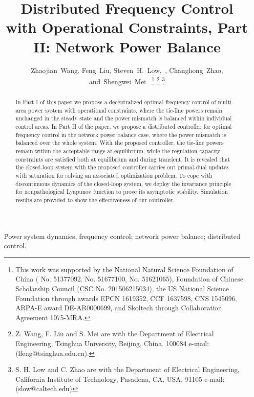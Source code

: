 \documentclass[journal]{IEEEtran}
\title{Distributed Frequency Control with Operational Constraints, Part II: Network Power Balance}
\author{Zhaojian~Wang, Feng~Liu, Steven~H.~Low,~\IEEEmembership{Fellow,~IEEE},
                Changhong~Zhao, and~Shengwei~Mei~\IEEEmembership{Fellow,~IEEE}
                \thanks{This work was supported  by the National Natural Science Foundation
                        of China ( No. 51377092, No. 51677100, No. 51621065), Foundation of Chinese Scholarship Council (CSC No. 201506215034), 
the US National Science Foundation through awards EPCN 1619352, CCF 1637598, 
CNS 1545096, ARPA-E award DE-AR0000699, and Skoltech through Collaboration
                        Agreement 1075-MRA.     }       %
                \thanks{Z. Wang, F. Liu and S. Mei are with the Department
                        of Electrical Engineering, Tsinghua University, Beijing,
                        China, 100084 e-mail: (lfeng@tsinghua.edu.cn).}%
                \thanks{S. H. Low and C. Zhao  are with the Department
                        of Electrical Engineering, California Institute of Technology, Pasadena, CA, USA, 91105 e-mail:(slow@caltech.edu)}
        }
\theoremstyle{definition}
\theoremstyle{definition}
\begin{document}
         \maketitle
        


        
        
\begin{abstract}                                                
    In Part I of this paper we propose a decentralized optimal frequency control of multi-area power system with operational constraints, where the tie-line powers  remain unchanged in the steady state and the power mismatch is balanced within individual control areas. In Part II of the paper, we propose a distributed controller for optimal frequency control in the network power balance case, where the power mismatch is balanced over the whole system. With the proposed controller,
	the tie-line powers remain within the acceptable range at equilibrium, while the regulation capacity constraints are satisfied both at equilibrium and during transient. It is revealed that the closed-loop system with the proposed controller carries out primal-dual updates with saturation for solving an associated optimization problem. To cope with discontinuous dynamics of the closed-loop system, we deploy the invariance principle for nonpathological Lyapunov function to prove its asymptotic stability. Simulation results are provided to show the effectiveness of our controller.
\end{abstract}
                
\begin{IEEEkeywords}
    Power system dynamics, frequency control; network power balance; distributed control.
\end{IEEEkeywords}
                
                
\IEEEpeerreviewmaketitle
        
        
%


%










\end{document}
